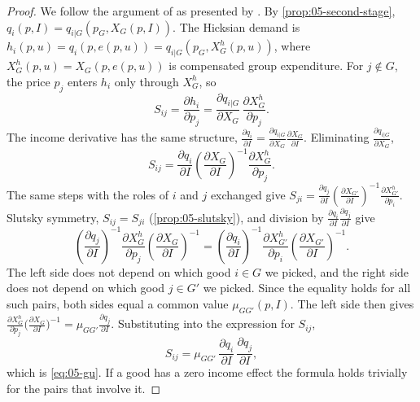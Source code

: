 \begin{proof}
We follow the argument of \citet{Gorman1971} as presented by \citet[\S 5.2, eqs.~2.4--2.9,
pp.~128--129]{DeatonMuellbauer1980b}. By \cref{prop:05-second-stage}, $q_i(p, I) = q_{i|G}(p_G, X_G(p, I))$. The Hicksian demand is $h_i(p, u) =
q_i(p, e(p, u)) = q_{i|G}(p_G, X_G^h(p, u))$, where $X_G^h(p,u) = X_G(p, e(p,u))$ is compensated group
expenditure. For $j \notin G$, the price $p_j$ enters $h_i$ only through $X_G^h$, so
\begin{equation*}
  S_{ij} = \frac{\partial h_i}{\partial p_j}
         = \frac{\partial q_{i|G}}{\partial X_G}\,\frac{\partial X_G^h}{\partial p_j}.
\end{equation*}
The income derivative has the same structure, $\frac{\partial q_i}{\partial I} = \frac{\partial
q_{i|G}}{\partial X_G}\frac{\partial X_G}{\partial I}$. Eliminating $\frac{\partial q_{i|G}}{\partial
X_G}$,
\begin{equation*}
  S_{ij} = \frac{\partial q_i}{\partial I}\left(\frac{\partial X_G}{\partial I}\right)^{-1}
           \frac{\partial X_G^h}{\partial p_j}.
\end{equation*}
The same steps with the roles of $i$ and $j$ exchanged give $S_{ji} = \frac{\partial q_j}{\partial I}
(\frac{\partial X_{G'}}{\partial I})^{-1}\frac{\partial X_{G'}^h}{\partial p_i}$. Slutsky symmetry,
$S_{ij} = S_{ji}$ (\cref{prop:05-slutsky}), and division by $\frac{\partial q_i}{\partial
I}\frac{\partial q_j}{\partial I}$ give
\begin{equation*}
  \left(\frac{\partial q_j}{\partial I}\right)^{-1}\frac{\partial X_G^h}{\partial p_j}
  \left(\frac{\partial X_G}{\partial I}\right)^{-1}
  = \left(\frac{\partial q_i}{\partial I}\right)^{-1}\frac{\partial X_{G'}^h}{\partial p_i}
  \left(\frac{\partial X_{G'}}{\partial I}\right)^{-1}.
\end{equation*}
The left side does not depend on which good $i \in G$ we picked, and the right side does not depend on
which good $j \in G'$ we picked. Since the equality holds for all such pairs, both sides equal a common
value $\mu_{GG'}(p, I)$. The left side then gives $\frac{\partial X_G^h}{\partial
p_j}\bigl(\frac{\partial X_G}{\partial I}\bigr)^{-1} = \mu_{GG'}\frac{\partial q_j}{\partial I}$.
Substituting into the expression for $S_{ij}$,
\begin{equation*}
  S_{ij} = \mu_{GG'}\,\frac{\partial q_i}{\partial I}\,\frac{\partial q_j}{\partial I},
\end{equation*}
which is \eqref{eq:05-gu}. If a good has a zero income effect the formula holds trivially for the pairs
that involve it.
\end{proof}

